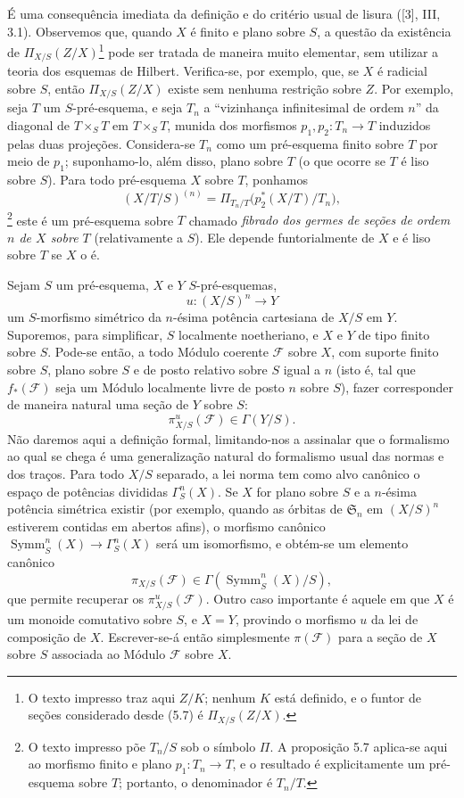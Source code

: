 É uma consequência imediata da definição e do critério usual de lisura ([3],
III, 3.1). Observemos que, quando $X$ é finito e plano sobre $S$, a questão da
existência de $\Pi_{X/S}(Z/X)$\footnote{O texto impresso traz aqui $Z/K$;
nenhum $K$ está definido, e o funtor de seções considerado desde (5.7) é
$\Pi_{X/S}(Z/X)$.} pode ser tratada de maneira muito elementar, sem
utilizar a teoria dos esquemas de Hilbert. Verifica-se, por exemplo, que, se
$X$ é radicial sobre $S$, então $\Pi_{X/S}(Z/X)$ existe sem nenhuma restrição
sobre $Z$. Por exemplo, seja $T$ um $S$-pré-esquema, e seja $T_n$ a
``vizinhança infinitesimal de ordem $n$'' da diagonal de $T\times_ST$ em
$T\times_ST$, munida dos morfismos $p_1,p_2:T_n\longrightarrow T$ induzidos
pelas duas projeções. Considera-se $T_n$ como um pré-esquema finito sobre $T$
por meio de $p_1$; suponhamo-lo, além disso, plano sobre $T$ (o que ocorre se
$T$ é liso sobre $S$). Para todo pré-esquema $X$ sobre $T$, ponhamos
\[
(X/T/S)^{(n)}=
\Pi_{T_n/T}\bigl(p_2^*(X/T)/T_n\bigr),
\]
\footnote{O texto impresso põe $T_n/S$ sob o símbolo $\Pi$. A proposição 5.7
aplica-se aqui ao morfismo finito e plano $p_1:T_n\to T$, e o resultado é
explicitamente um pré-esquema sobre $T$; portanto, o denominador é $T_n/T$.}
este é um pré-esquema sobre $T$ chamado \emph{fibrado dos germes de seções de
ordem $n$ de $X$ sobre $T$} (relativamente a $S$). Ele depende funtorialmente
de $X$ e é liso sobre $T$ se $X$ o é.


Sejam $S$ um pré-esquema, $X$ e $Y$ $S$-pré-esquemas,
\[
u:(X/S)^n\longrightarrow Y
\]
um $S$-morfismo simétrico da $n$-ésima potência cartesiana de $X/S$ em $Y$.
Suporemos, para simplificar, $S$ localmente noetheriano, e $X$ e $Y$ de tipo
finito sobre $S$. Pode-se então, a todo Módulo coerente $\mathcal F$ sobre $X$,
com suporte finito sobre $S$, plano sobre $S$ e de posto relativo sobre $S$
igual a $n$ (isto é, tal que $f_*(\mathcal F)$ seja um Módulo localmente livre
de posto $n$ sobre $S$), fazer corresponder de maneira natural uma seção de $Y$
sobre $S$:
\[
\pi^u_{X/S}(\mathcal F)\in\Gamma(Y/S).
\]
Não daremos aqui a definição formal, limitando-nos a assinalar que o formalismo
ao qual se chega é uma generalização natural do formalismo usual das normas e
dos traços. Para todo $X/S$ separado, a lei norma tem como alvo canônico o espaço de potências divididas $\Gamma^n_S(X)$. Se $X$ for plano sobre $S$ e a $n$-ésima potência simétrica existir (por exemplo, quando as órbitas de $\mathfrak S_n$ em $(X/S)^n$ estiverem contidas em abertos afins), o morfismo canônico $\operatorname{Symm}^n_S(X)\to\Gamma^n_S(X)$ será um isomorfismo, e obtém-se um elemento canônico
\[
\pi_{X/S}(\mathcal F)\in\Gamma(\operatorname{Symm}^n_S(X)/S),
\]
que permite recuperar os $\pi^u_{X/S}(\mathcal F)$. Outro caso importante é
aquele em que $X$ é um monoide comutativo sobre $S$, e $X=Y$, provindo o
morfismo $u$ da lei de composição de $X$. Escrever-se-á então simplesmente
$\pi(\mathcal F)$ para a seção de $X$ sobre $S$ associada ao Módulo
$\mathcal F$ sobre $X$.

